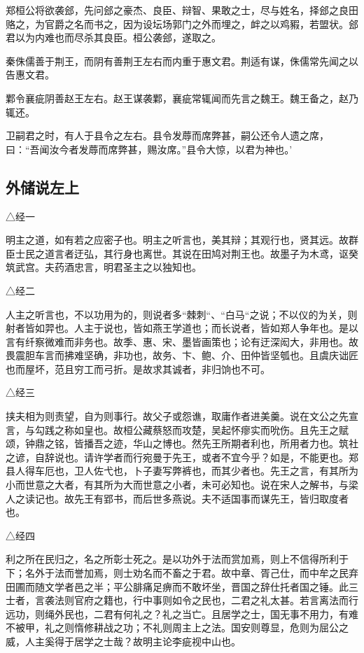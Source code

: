 \documentclass[]{article}
\begin{document}
郑桓公将欲袭郐，先问郐之豪杰、良臣、辩智、果敢之士，尽与姓名，择郐之良田赂之，为官爵之名而书之，因为设坛场郭门之外而埋之，衅之以鸡豭，若盟状。郐君以为内难也而尽杀其良臣。桓公袭郐，遂取之。

秦侏儒善于荆王，而阴有善荆王左右而内重于惠文君。荆适有谋，侏儒常先闻之以告惠文君。

鄴令襄疵阴善赵王左右。赵王谋袭鄴，襄疵常辄闻而先言之魏王。魏王备之，赵乃辄还。

卫嗣君之时，有人于县令之左右。县令发蓐而席弊甚，嗣公还令人遗之席，曰：``吾闻汝今者发蓐而席弊甚，赐汝席。''县令大惊，以君为神也。'

\hypertarget{header-n1252}{%
\subsection{外储说左上}\label{header-n1252}}

△经一

明主之道，如有若之应密子也。明主之听言也，美其辩；其观行也，贤其远。故群臣士民之道言者迂弘，其行身也离世。其说在田鸠对荆王也。故墨子为木鸢，讴癸筑武宫。夫药酒忠言，明君圣主之以独知也。

△经二

人主之听言也，不以功用为的，则说者多``棘刺``、``白马``之说；不以仪的为关，则射者皆如羿也。人主于说也，皆如燕王学道也；而长说者，皆如郑人争年也。是以言有纤察微难而非务也。故季、惠、宋、墨皆画策也；论有迂深闳大，非用也。故畏震胆车言而拂难坚确，非功也，故务、卞、鲍、介、田仲皆坚瓠也。且虞庆诎匠也而屋坏，范且穷工而弓折。是故求其诚者，非归饷也不可。

△经三

挟夫相为则责望，自为则事行。故父子或怨谯，取庸作者进美羹。说在文公之先宣言，与勾践之称如皇也。故桓公藏蔡怒而攻楚，吴起怀瘳实而吮伤。且先王之赋颂，钟鼎之铭，皆播吾之迹，华山之博也。然先王所期者利也，所用者力也。筑社之谚，自辞说也。请许学者而行宛曼于先王，或者不宜今乎？如是，不能更也。郑县人得车厄也，卫人佐弋也，卜子妻写弊裤也，而其少者也。先王之言，有其所为小而世意之大者，有其所为大而世意之小者，未可必知也。说在宋人之解书，与梁人之读记也。故先王有郢书，而后世多燕说。夫不适国事而谋先王，皆归取度者也。

△经四

利之所在民归之，名之所彰士死之。是以功外于法而赏加焉，则上不信得所利于下；名外于法而誉加焉，则士劝名而不畜之于君。故中章、胥己仕，而中牟之民弃田圃而随文学者邑之半；平公腓痛足痹而不敢坏坐，晋国之辞仕托者国之锤。此三士者，言袭法则官府之籍也，行中事则如令之民也，二君之礼太甚。若言离法而行远功，则绳外民也，二君有何礼之？礼之当亡。且居学之士，国无事不用力，有难不被甲，礼之则惰修耕战之功；不礼则周主上之法。国安则尊显，危则为屈公之威，人主奚得于居学之士哉？故明主论李疵视中山也。
\end{document}
